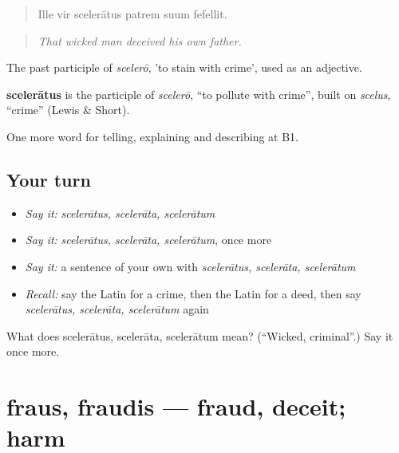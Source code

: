 \begin{quote}
Ille vir scelerātus patrem suum fefellit.
\end{quote}

\begin{quote}
\emph{That wicked man deceived his own father.}
\end{quote}

The past participle of \emph{scelerō}, 'to stain with crime', used as an adjective.

\begin{cousinweb}
\textbf{scelerātus} is the participle of \emph{scelerō}, \textquotedblleft{}to pollute with crime\textquotedblright{}, built on \emph{scelus}, \textquotedblleft{}crime\textquotedblright{} (Lewis \& Short).
\end{cousinweb}

\begin{grammarlens}[title={What you've built}]
One more word for telling, explaining and describing at B1.
\end{grammarlens}

\subsection*{Your turn}
\begin{itemize}
\raggedright
  \item \emph{Say it:} \emph{scelerātus, scelerāta, scelerātum}
  \item \emph{Say it:} \emph{scelerātus, scelerāta, scelerātum}, once more
  \item \emph{Say it:} a sentence of your own with \emph{scelerātus, scelerāta, scelerātum}
  \item \emph{Recall:} say the Latin for a crime, then the Latin for a deed, then say \emph{scelerātus, scelerāta, scelerātum} again
\end{itemize}

\begin{tcolorbox}[breakable,colback=teal!4,colframe=teal!35!black,title={Before you move on}]
What does scelerātus, scelerāta, scelerātum mean? (\textquotedblleft{}Wicked, criminal\textquotedblright{}.) Say it once more.
\end{tcolorbox}
\section[fraus, fraudis]{fraus, fraudis — fraud, deceit; harm}

\label{lesson:LA-C305-fraus}




